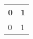 \begin{tabular}{|l|l|}
\hline
\multicolumn{1}{|c|}{0} & 1 \\ \hline
0                       & 1 \\ \hline
\end{tabular}
